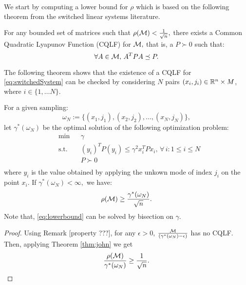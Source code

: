 We start by computing a lower bound for $\rho$ which is based on the following theorem from the switched linear systems literature.

\begin{theorem}\cite[Theorem 2.11]{jungers_lncis}\label{thm:john}
For any bounded set of matrices such that $\rho(\mathcal{M})<\frac{1}{\sqrt{n}},$ there exists a Common Quadratic Lyapunov Function (CQLF) for $\mathcal{M},$ that is, a $P\succ 0$ such that: $$\forall A\in \mathcal{M},\, A^TPA\preceq P. $$
\end{theorem}

The following theorem shows that the existence of a CQLF for \eqref{eq:switchedSystem} can be checked by considering $N$ pairs $(x_i, j_i) \in \mathbb{R}^n \times M$, where $i \in \{1, \ldots N\}.$%
%

\begin{theorem}
For a given sampling: $$\omega_N := \{(x_1, j_1), (x_2, j_2), \ldots, (x_N, j_N)\},$$ let $\gamma^*(\omega_N)$ be the optimal solution of the following optimization problem:
\begin{equation}\label{eq:lowerbound}
\begin{aligned}
& \text{min} & & \gamma \\
& \text{s.t.} 
&  & (y_i)^T P (y_i) \leq \gamma^2 x_i^TPx_i,\,  \forall \,i :1\leq i \leq N\\
& && P \succ 0 \\
\end{aligned}
\end{equation}
where $y_i$ is the value obtained by applying the unkown mode of index $j_i$ on the point $x_i$.
If $\gamma^*(\omega_N)<\infty,$ we have:
$$\rho(\mathcal{M}) \geq \frac{\gamma^*(\omega_N)}{\sqrt{n}}.$$ Note that, \eqref{eq:lowerbound} can be solved by bisection on $\gamma$.

\end{theorem}
\begin{proof}
Using Remark [property ???], for any $\epsilon > 0$, $\frac{\mathcal{M}}{(\gamma^*(\omega_N)-\epsilon)}$ has no CQLF. Then, applying Theorem \ref{thm:john} we get
\begin{equation*}\frac{\rho(\mathcal{M})}{\gamma^*(\omega_N)} \geq \frac{1}{\sqrt{n}}.\end{equation*}
\end{proof}